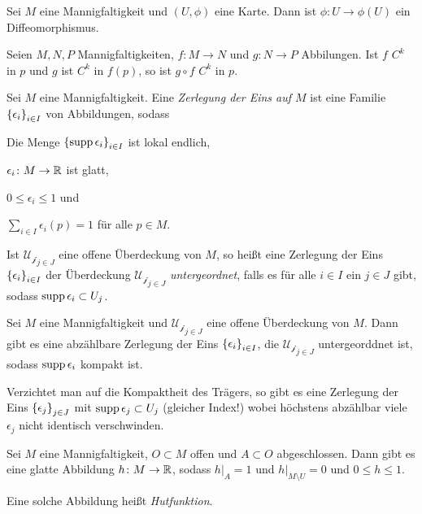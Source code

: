 \begin{proposition}
  Sei $M$ eine Mannigfaltigkeit und $(U,\phi)$ eine Karte. Dann ist
  $\phi\colon U \to \phi(U)$ ein Diffeomorphismus.
\end{proposition}

\begin{proposition}
  Seien $M,N,P$ Mannigfaltigkeiten, $f\colon M \to N$ und $g\colon
  N\to P$ Abbilungen. Ist $f$ $C^k$ in $p$ und $g$ ist $C^k$ in
  $f(p)$, so ist $g\circ f$ $C^k$ in $p$.
\end{proposition}

\begin{definition}
 Sei $M$ eine Mannigfaltigkeit. Eine
  \emph{Zerlegung der Eins auf $M$} ist eine
  Familie $\left\lbrace \epsilon_i \right\rbrace_{i\in I}$ von Abbildungen, sodass
  \begin{properties}
  \item Die Menge $\left\lbrace \operatorname{supp}\epsilon_i \right\rbrace_{i\in I}$ ist lokal endlich,
  \item $\epsilon_i \colon M \to \mathbb{R}$ ist glatt,
  \item $0\leq \epsilon_i \leq 1$ und
  \item $\sum_{i\in I}\epsilon_i(p) = 1$ für alle $p\in M$. 
  \end{properties}

  Ist $\mathcal{U_j}_{j\in J}$ eine offene Überdeckung von $M$, so
  heißt eine Zerlegung der Eins $\left\lbrace \epsilon_i \right\rbrace_{i\in I}$ der
  Überdeckung $\mathcal{U_j}_{j\in J}$ \emph{untergeordnet}, falls es
  für alle $i\in I$ ein $j\in J$ gibt, sodass $\operatorname{supp}\epsilon_i \subset
  U_j$.
\end{definition}

\begin{proposition}
  Sei $M$ eine Mannigfaltigkeit und $\mathcal{U_j}_{j\in J}$ eine
  offene Überdeckung von $M$. Dann gibt es eine abzählbare Zerlegung
  der Eins $\left\lbrace \epsilon_i \right\rbrace_{i\in I}$, die $\mathcal{U_j}_{j\in J}$ untergeorddnet ist, sodass
  $\operatorname{supp}\epsilon_i$ kompakt ist.

  Verzichtet man auf die Kompaktheit des Trägers, so gibt es eine
  Zerlegung der Eins $\left\lbrace \epsilon_j \right\rbrace_{j\in J}$ mit $\operatorname{supp}\epsilon_j
  \subset U_j$ (gleicher Index!) wobei höchstens abzählbar viele
  $\epsilon_j$ nicht identisch verschwinden.
\end{proposition}

\begin{korollar}
  Sei $M$ eine Mannigfaltigkeit, $O\subset M$ offen und $A \subset O$
  abgeschlossen. Dann gibt es eine glatte Abbildung $h\colon M \to
  \mathbb{R}$, sodass $h|_A = 1$ und $h|_{M\setminus U} = 0$ und $0 \leq h
  \leq 1$.

  Eine solche Abbildung heißt \emph{Hutfunktion}.
\end{korollar}

